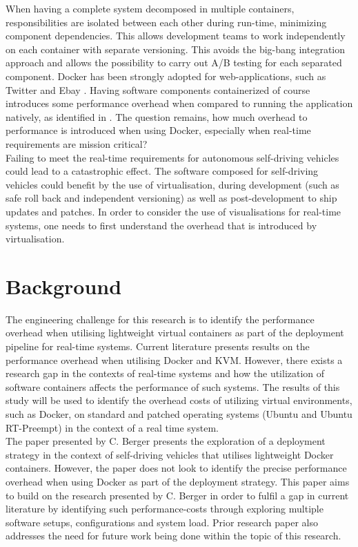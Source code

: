 When having a complete system decomposed in multiple containers, responsibilities are isolated between each other during run-time, minimizing component dependencies. This allows development teams to work independently on each container with separate versioning. This avoids the big-bang integration approach and allows the possibility to carry out A/B testing for each separated component. Docker has been strongly adopted for web-applications, such as Twitter and Ebay \cite{7034713}. Having software components containerized of course introduces some performance overhead when compared to running the application natively, as identified in \cite{7034713}. The question remains, how much overhead to performance is introduced when using Docker, especially when real-time requirements are mission critical?\\

Failing to meet the real-time requirements for autonomous self-driving vehicles could lead to a catastrophic effect. The software composed for self-driving vehicles could benefit by the use of virtualisation, during development (such as safe roll back and independent versioning) as well as post-development to ship updates and patches. In order to consider the use of visualisations for real-time systems, one needs to first understand the overhead that is introduced by virtualisation.\\

\section{Background}

The engineering challenge for this research is to identify the performance overhead when utilising lightweight virtual containers as part of the deployment pipeline for real-time systems. Current literature \cite{vmvscontainers} presents results on the performance overhead when utilising Docker and KVM. However, there exists a research gap in the contexts of real-time systems and how the utilization of software containers affects the performance of such systems. The results of this study will be used to identify the overhead costs of utilizing virtual environments, such as Docker, on standard and patched operating systems (Ubuntu and Ubuntu RT-Preempt) in the context of a real time system.\\

The paper presented by C. Berger \cite{cberger} presents the exploration of a deployment strategy in the context of self-driving vehicles that utilises lightweight Docker containers. However, the paper does not look to identify the precise performance overhead when using Docker as part of the deployment strategy. This paper aims to build on the research presented by C. Berger in order to fulfil a gap in current literature by identifying such performance-costs through exploring multiple software setups, configurations and system load. Prior research paper \cite{cberger} also addresses the need for future work being done within the topic of this research.\\

